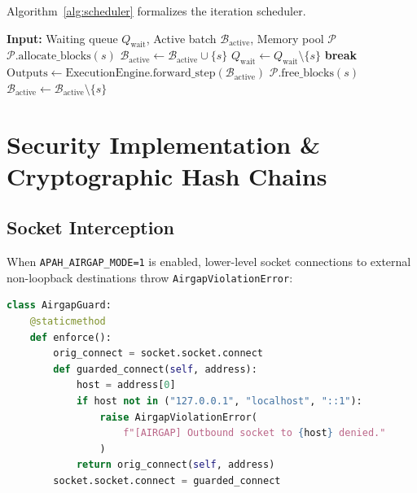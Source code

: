 \documentclass[10pt,twocolumn,a4paper]{article}
\theoremstyle{definition}
\theoremstyle{remark}
\begin{document}
Algorithm~\ref{alg:scheduler} formalizes the iteration scheduler.

\begin{algorithm}[h]
\caption{Apah Iteration Continuous Batch Scheduler}
\label{alg:scheduler}
\begin{algorithmic}[1]
\State \textbf{Input:} Waiting queue $Q_{\text{wait}}$, Active batch $\mathcal{B}_{\text{active}}$, Memory pool $\mathcal{P}$
            \State $\mathcal{P}.\text{allocate\_blocks}(s)$
            \State $\mathcal{B}_{\text{active}} \gets \mathcal{B}_{\text{active}} \cup \{s\}$
            \State $Q_{\text{wait}} \gets Q_{\text{wait}} \setminus \{s\}$
        \Else
            \State \textbf{break} 
        \EndIf
    \EndFor
    \State $\text{Outputs} \gets \text{ExecutionEngine.forward\_step}(\mathcal{B}_{\text{active}})$
            \State $\mathcal{P}.\text{free\_blocks}(s)$
            \State $\mathcal{B}_{\text{active}} \gets \mathcal{B}_{\text{active}} \setminus \{s\}$
        \EndIf
    \EndFor
\EndWhile
\end{algorithmic}
\end{algorithm}

\section{Security Implementation \& Cryptographic Hash Chains}
\label{sec:security}

\subsection{Socket Interception}
When \texttt{APAH\_AIRGAP\_MODE=1} is enabled, lower-level socket connections to external non-loopback destinations throw \texttt{AirgapViolationError}:

\begin{lstlisting}[language=Python, caption=Low-level Socket Monkey-Patching in Apah Runtime]
class AirgapGuard:
    @staticmethod
    def enforce():
        orig_connect = socket.socket.connect
        def guarded_connect(self, address):
            host = address[0]
            if host not in ("127.0.0.1", "localhost", "::1"):
                raise AirgapViolationError(
                    f"[AIRGAP] Outbound socket to {host} denied."
                )
            return orig_connect(self, address)
        socket.socket.connect = guarded_connect
\end{lstlisting}
\end{document}
